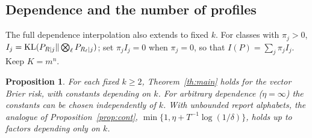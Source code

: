\documentclass[11pt,a4paper]{article}
\newtheorem{proposition}[theorem]{Proposition}
\theoremstyle{remark}
\newcommand{\KL}{\mathop{\rm KL}\nolimits}
\begin{document}
\subsection{Dependence and the number of profiles}
The full dependence interpolation also extends to fixed $k$. For classes with $\pi_j>0$, $I_j=\KL(P_{R\mid j}\|\bigotimes_\ell P_{R_\ell\mid j})$; set $\pi_jI_j=0$ when $\pi_j=0$, so that $I(P)=\sum_j\pi_jI_j$. Keep $K=m^n$.

\begin{proposition}\label{prop:multirobust}
For each fixed $k\ge2$, Theorem~\ref{th:main} holds for the vector Brier risk, with constants depending on $k$. For arbitrary dependence ($\eta=\infty$) the constants can be chosen independently of $k$. With unbounded report alphabets, the analogue of Proposition~\ref{prop:cont}, $\min\{1,\eta+T^{-1}\log(1/\delta)\}$, holds up to factors depending only on $k$.
\end{proposition}
\end{document}
